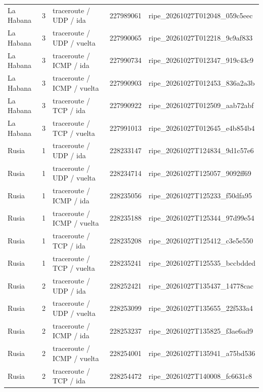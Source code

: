 \begin{longtable}{p{2cm}p{1.15cm}p{4.2cm}p{2.2cm}p{4.95cm}}
La Habana & 3 & traceroute / UDP / ida & 227989061 & ripe\_\allowbreak{}20261027T012048\_\allowbreak{}059c5eec \\
La Habana & 3 & traceroute / UDP / vuelta & 227990065 & ripe\_\allowbreak{}20261027T012218\_\allowbreak{}9c9af833 \\
La Habana & 3 & traceroute / ICMP / ida & 227990734 & ripe\_\allowbreak{}20261027T012347\_\allowbreak{}919c43c9 \\
La Habana & 3 & traceroute / ICMP / vuelta & 227990903 & ripe\_\allowbreak{}20261027T012453\_\allowbreak{}836a2a3b \\
La Habana & 3 & traceroute / TCP / ida & 227990922 & ripe\_\allowbreak{}20261027T012509\_\allowbreak{}aab72abf \\
La Habana & 3 & traceroute / TCP / vuelta & 227991013 & ripe\_\allowbreak{}20261027T012645\_\allowbreak{}e4b854b4 \\
Rusia & 1 & traceroute / UDP / ida & 228233147 & ripe\_\allowbreak{}20261027T124834\_\allowbreak{}9d1c57e6 \\
Rusia & 1 & traceroute / UDP / vuelta & 228234714 & ripe\_\allowbreak{}20261027T125057\_\allowbreak{}9092ff69 \\
Rusia & 1 & traceroute / ICMP / ida & 228235056 & ripe\_\allowbreak{}20261027T125233\_\allowbreak{}f50dfa95 \\
Rusia & 1 & traceroute / ICMP / vuelta & 228235188 & ripe\_\allowbreak{}20261027T125344\_\allowbreak{}97d99e54 \\
Rusia & 1 & traceroute / TCP / ida & 228235208 & ripe\_\allowbreak{}20261027T125412\_\allowbreak{}c3e5e550 \\
Rusia & 1 & traceroute / TCP / vuelta & 228235241 & ripe\_\allowbreak{}20261027T125535\_\allowbreak{}bccbdded \\
Rusia & 2 & traceroute / UDP / ida & 228252421 & ripe\_\allowbreak{}20261027T135437\_\allowbreak{}14778cac \\
Rusia & 2 & traceroute / UDP / vuelta & 228253099 & ripe\_\allowbreak{}20261027T135655\_\allowbreak{}22f533a4 \\
Rusia & 2 & traceroute / ICMP / ida & 228253237 & ripe\_\allowbreak{}20261027T135825\_\allowbreak{}f3ae6ad9 \\
Rusia & 2 & traceroute / ICMP / vuelta & 228254001 & ripe\_\allowbreak{}20261027T135941\_\allowbreak{}a75bd536 \\
Rusia & 2 & traceroute / TCP / ida & 228254472 & ripe\_\allowbreak{}20261027T140008\_\allowbreak{}fc6631c8 \\

\end{longtable}
